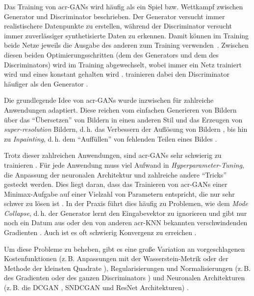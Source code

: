 Das Training von \gls{acr-GAN}s wird häufig als ein Spiel bzw. Wettkampf
zwischen Generator und Discriminator beschrieben.
Der Generator versucht immer realistischere Datenpunkte
zu erstellen, während der Discriminator versucht immer zuverlässiger
synthetisierte Daten zu erkennen. Damit können im Training beide Netze jeweils
die Ausgabe des anderen zum Training verwenden~\cite[S. 625]{raschka2019}.
Zwischen diesen beiden Optimierungsschritten (dem des Generators und dem des
Discriminators) wird im Training abgewechselt, wobei immer ein Netz trainiert
wird und eines konstant gehalten wird \cite[S. 626]{raschka2019}. 
trainieren dabei den Discriminator häufiger als den Generator \cite[S.
3]{goodfellow2014generative}.

Die grundlegende Idee von \gls{acr-GAN}s wurde inzwischen für zahlreiche
Anwendungen adaptiert. Diese reichen vom einfachen Generieren von Bildern
\cite{goodfellow2014generative, arjovsky2017wasserstein,
gulrajani2017improved,kurach2018gan, miyato2018spectral} über das \enquote{Übersetzen}
von Bildern in einen anderen Stil
\cite{pang2021image,isola2017image,zhu2017unpaired,
liu2019few,saito2020coco,anokhin2020high} und das Erzeugen von
\emph{super-resolution} Bildern, d.\,h. das Verbessern der Auflösung von Bildern
\cite{pang2021image,anokhin2020high,ledig2017photo}, bis hin zu
\emph{Inpainting}, d.\,h. dem \enquote{Auffüllen} von fehlenden Teilen eines Bildes
\cite{pang2021image,isola2017image, demir2018patch}.

Trotz dieser zahlreichen Anwendungen, sind \gls{acr-GAN}s sehr schwierig zu
trainieren \cite[S. 1]{kurach2018gan}. Für jede Anwendung muss viel Aufwand in
\emph{Hyperparameter-Tuning}, die Anpassung der neuronalen Architektur und
zahlreiche andere \enquote{Tricks} \cite[vgl.][]{kurach2018gan} gesteckt werden. Dies
liegt daran, dass das Trainieren von \gls{acr-GAN}s einer
Minimax-Aufgabe auf einer Vielzahl von Parametern entspricht, die nur sehr
schwer zu lösen ist \cite[S. 1]{kurach2018gan}. In der Praxis führt dies häufig
zu Problemen, wie dem \emph{Mode Collapse}, d.\,h. der Generator lernt den
Eingabevektor zu ignorieren und gibt nur noch ein Datum aus \cite[S.
4]{pang2021image} oder den von anderen \gls{acr-KNN} bekannten verschwindenden
Gradienten \cite[S. 6]{arjovsky2017towards}. Auch ist es oft schwierig
Konvergenz zu erreichen \cite[S. 4]{pang2021image}.

Um diese Probleme zu beheben, gibt es eine große Variation an vorgeschlagenen
Kostenfunktionen (z.\,B. Anpassungen mit der Wasserstein-Metrik
\cite{arjovsky2017wasserstein} oder der Methode der kleinsten Quadrate \cite[S.
2]{kurach2018gan}), Regularisierungen und Normalisierungen (z.\,B. des
Gradienten oder des ganzen Discriminators \cite[S. 2f.]{kurach2018gan}) und 
Neuronalen Architekturen (z.\,B. die DCGAN \cite{radford2015unsupervised},
SNDCGAN \cite{miyato2018spectral} und ResNet \cite{zhu2017unpaired}
Architekturen) \cite[vgl.][S. 1,3]{kurach2018gan}.

